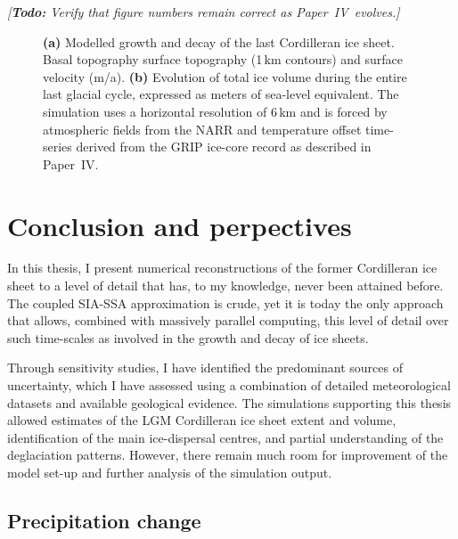 \documentclass{article}
\newcommand{\todo}[1]{\emph{[\textbf{Todo:} #1]}}
\newcommand{\CCYC}[0]{Paper~IV}     %
\begin{document}
\todo{Verify that figure numbers remain correct as \CCYC\ evolves.}

\begin{figure}
  \centering
  \caption{\textbf{(a)} Modelled growth and decay of the last Cordilleran ice
           sheet. Basal topography surface topography (1\,km contours) and
           surface velocity (m/a).
           \textbf{(b)} Evolution of total ice volume during the entire last
           glacial cycle, expressed as meters of sea-level equivalent. The
           simulation uses a horizontal resolution of 6\,km and is forced by
           atmospheric fields from the NARR \citep{Mesinger.etal.2006} and
           temperature offset time-series derived from the GRIP
           \citep{Dansgaard.etal.1993} ice-core record as described in \CCYC.}
  \label{fig:plot-snapshots}
\end{figure}


\section{Conclusion and perpectives}

In this thesis, I present numerical reconstructions of the former Cordilleran
ice sheet to a level of detail that has, to my knowledge, never been attained
before. The coupled SIA-SSA approximation is crude, yet it is today the only
approach that allows, combined with massively parallel computing, this level of
detail over such time-scales as involved in the growth and decay of ice sheets.

Through sensitivity studies, I have identified the predominant sources of
uncertainty, which I have assessed using a combination of detailed
meteorological datasets and available geological evidence. The simulations
supporting this thesis allowed estimates of the LGM Cordilleran ice sheet
extent and volume, identification of the main ice-dispersal centres, and
partial understanding of the deglaciation patterns. However, there remain much
room for improvement of the model set-up and further analysis of the simulation
output.


\subsection{Precipitation change}
\end{document}
